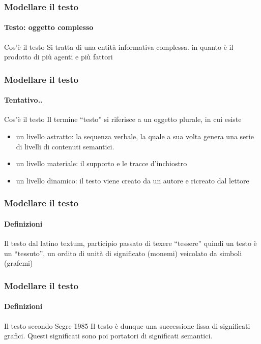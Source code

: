 \begin{frame}
	\frametitle{Modellare il testo}
	\framesubtitle{Testo: oggetto complesso}
	\addtocounter{nframe}{1}

	\begin{block}{Cos'è il testo}
		Si tratta di una entità informativa complessa. in quanto è il prodotto di più agenti e più fattori
	\end{block}

\end{frame}

\begin{frame}
	\frametitle{Modellare il testo}
	\framesubtitle{Tentativo..}
	\addtocounter{nframe}{1}

	\begin{block}{Cos'è il testo}
		Il termine ``testo''  si riferisce a un oggetto plurale, in cui esiste
		\begin{itemize}
			\item un livello astratto: la sequenza verbale, la quale a sua volta genera una serie di livelli di contenuti semantici.
			\item un livello materiale: il supporto e le tracce d’inchiostro
			\item un livello dinamico: il testo viene creato da un autore e ricreato dal lettore
		\end{itemize}

	\end{block}

\end{frame}


\begin{frame}
	\frametitle{Modellare il testo}
	\framesubtitle{Definizioni}
	\addtocounter{nframe}{1}

	\begin{block}{Il testo}
		dal latino textum, participio passato di texere ``tessere'' quindi un testo è un ``tessuto'', un ordito di unità di significato (monemi) veicolato da simboli (grafemi)
	\end{block}

\end{frame}

\begin{frame}
	\frametitle{Modellare il testo}
	\framesubtitle{Definizioni}
	\addtocounter{nframe}{1}

	\begin{block}{Il testo secondo Segre 1985}
		Il testo è dunque una successione fissa di significati grafici. Questi significati sono poi portatori di significati semantici.
	\end{block}

\end{frame}

